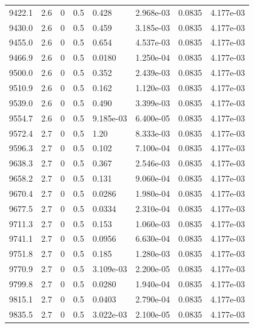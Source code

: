 \documentclass[preview]{standalone}
\begin{document}
{{{{{{{{{{\begin{tabular}{L{1.2cm}C{1.2cm} C{0.3cm}C{0.5cm} C{1.4cm}C{1.4cm} C{1.4cm}C{1.4cm}}
  9422.1  &   2.6  & 0     & 0.5 &  0.428  & 2.968e-03  & 0.0835 &  4.177e-03   \\ 
  9430.0  &   2.6  & 0     & 0.5 &  0.459  & 3.185e-03  & 0.0835 &  4.177e-03   \\ 
  9455.0  &   2.6  & 0     & 0.5 &  0.654  & 4.537e-03  & 0.0835 &  4.177e-03   \\ 
  9466.9  &   2.6  & 0     & 0.5 &  0.0180  & 1.250e-04  & 0.0835 &  4.177e-03   \\ 
  9500.0  &   2.6  & 0     & 0.5 &  0.352  & 2.439e-03  & 0.0835 &  4.177e-03   \\ 
  9510.9  &   2.6  & 0     & 0.5 &  0.162  & 1.120e-03  & 0.0835 &  4.177e-03   \\ 
  9539.0  &   2.6  & 0     & 0.5 &  0.490  & 3.399e-03  & 0.0835 &  4.177e-03   \\ 
  9554.7  &   2.6  & 0     & 0.5 &  9.185e-03  & 6.400e-05  & 0.0835 &  4.177e-03   \\ 
  9572.4  &   2.7  & 0     & 0.5 &  1.20  & 8.333e-03  & 0.0835 &  4.177e-03   \\ 
  9596.3  &   2.7  & 0     & 0.5 &  0.102  & 7.100e-04  & 0.0835 &  4.177e-03   \\ 
  9638.3  &   2.7  & 0     & 0.5 &  0.367  & 2.546e-03  & 0.0835 &  4.177e-03   \\ 
  9658.2  &   2.7  & 0     & 0.5 &  0.131  & 9.060e-04  & 0.0835 &  4.177e-03   \\ 
  9670.4  &   2.7  & 0     & 0.5 &  0.0286  & 1.980e-04  & 0.0835 &  4.177e-03   \\ 
  9677.5  &   2.7  & 0     & 0.5 &  0.0334  & 2.310e-04  & 0.0835 &  4.177e-03   \\ 
  9711.3  &   2.7  & 0     & 0.5 &  0.153  & 1.060e-03  & 0.0835 &  4.177e-03   \\ 
  9741.1  &   2.7  & 0     & 0.5 &  0.0956  & 6.630e-04  & 0.0835 &  4.177e-03   \\ 
  9751.8  &   2.7  & 0     & 0.5 &  0.185  & 1.280e-03  & 0.0835 &  4.177e-03   \\ 
  9770.9  &   2.7  & 0     & 0.5 &  3.109e-03  & 2.200e-05  & 0.0835 &  4.177e-03   \\ 
  9799.8  &   2.7  & 0     & 0.5 &  0.0280  & 1.940e-04  & 0.0835 &  4.177e-03   \\ 
  9815.1  &   2.7  & 0     & 0.5 &  0.0403  & 2.790e-04  & 0.0835 &  4.177e-03   \\ 
  9835.5  &   2.7  & 0     & 0.5 &  3.022e-03  & 2.100e-05  & 0.0835 &  4.177e-03   \\ 

\end{tabular}}}}}}}}}}}
\end{document}
